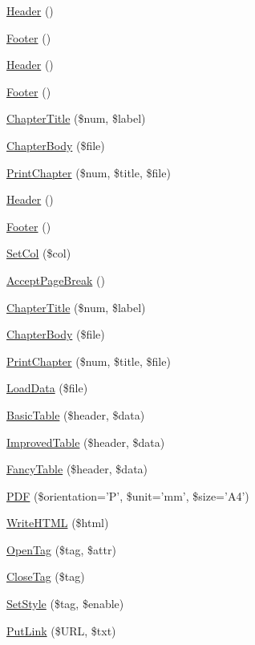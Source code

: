 \begin{DoxyCompactItemize}
\item 
\hyperlink{class_p_d_f_a0061f0841056944eadb71aebff1a7e3f}{Header} ()
\item 
\hyperlink{class_p_d_f_a19758115c116e54e7dc34f82ca7901d5}{Footer} ()
\item 
\hyperlink{class_p_d_f_a0061f0841056944eadb71aebff1a7e3f}{Header} ()
\item 
\hyperlink{class_p_d_f_a19758115c116e54e7dc34f82ca7901d5}{Footer} ()
\item 
\hyperlink{class_p_d_f_ae60a50a6353dbaf7ccc34b5e7a787f19}{Chapter\-Title} (\$num, \$label)
\item 
\hyperlink{class_p_d_f_abea4e002f625542000a14c4b2ab2b2b8}{Chapter\-Body} (\$file)
\item 
\hyperlink{class_p_d_f_aaf78159202d63e0e14fc371c89bcf288}{Print\-Chapter} (\$num, \$title, \$file)
\item 
\hyperlink{class_p_d_f_a0061f0841056944eadb71aebff1a7e3f}{Header} ()
\item 
\hyperlink{class_p_d_f_a19758115c116e54e7dc34f82ca7901d5}{Footer} ()
\item 
\hyperlink{class_p_d_f_a3aff295a304e0b0c923e46836d30159d}{Set\-Col} (\$col)
\item 
\hyperlink{class_p_d_f_affff932c64a37a806fcd3a9ee2db0f19}{Accept\-Page\-Break} ()
\item 
\hyperlink{class_p_d_f_ae60a50a6353dbaf7ccc34b5e7a787f19}{Chapter\-Title} (\$num, \$label)
\item 
\hyperlink{class_p_d_f_abea4e002f625542000a14c4b2ab2b2b8}{Chapter\-Body} (\$file)
\item 
\hyperlink{class_p_d_f_aaf78159202d63e0e14fc371c89bcf288}{Print\-Chapter} (\$num, \$title, \$file)
\item 
\hyperlink{class_p_d_f_a8ec6d4ee87b6bcfc10893d225b3ef39c}{Load\-Data} (\$file)
\item 
\hyperlink{class_p_d_f_a29249473954e4420d6eabf4e278af3d0}{Basic\-Table} (\$header, \$data)
\item 
\hyperlink{class_p_d_f_a0ae14feb2799b7d809e24bda24e708a3}{Improved\-Table} (\$header, \$data)
\item 
\hyperlink{class_p_d_f_a8d44dd96b63b354d40f04c34038360fc}{Fancy\-Table} (\$header, \$data)
\item 
\hyperlink{class_p_d_f_a3cbb94ede10beb1b6358febb48f6c0a0}{P\-D\-F} (\$orientation='P', \$unit='mm', \$size='A4')
\item 
\hyperlink{class_p_d_f_a80bf28129fee358ee8888ce8c2f6273c}{Write\-H\-T\-M\-L} (\$html)
\item 
\hyperlink{class_p_d_f_a2c96493c42bc1d07268194e303fbf87f}{Open\-Tag} (\$tag, \$attr)
\item 
\hyperlink{class_p_d_f_aacf9a54e89e6cc1f6c0c47ad7929a2fd}{Close\-Tag} (\$tag)
\item 
\hyperlink{class_p_d_f_ac72ce8cec6f15cc8f7f08fc0fedeb846}{Set\-Style} (\$tag, \$enable)
\item 
\hyperlink{class_p_d_f_aed7b9ddbd7ec1e334c5687a62129941b}{Put\-Link} (\$U\-R\-L, \$txt)
\end{DoxyCompactItemize}
